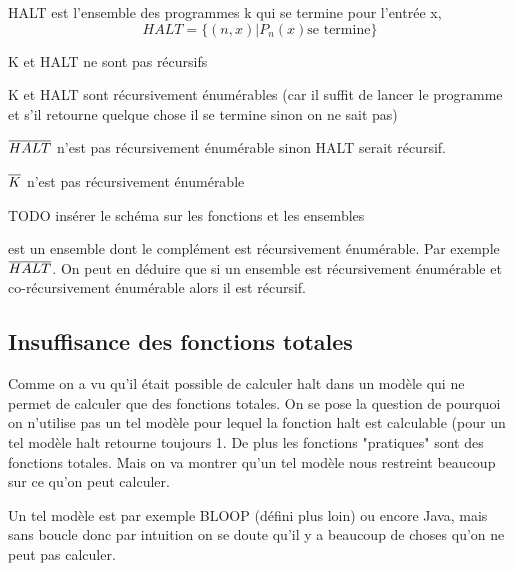 \begin{mydef}[HALT]
	HALT est l'ensemble des programmes k qui se termine pour l'entrée x, 
	\[ HALT = \{(n,x)|P_n(x)\text{se termine}\}\]
\end{mydef}

\begin{myprop}
	K et HALT ne sont pas récursifs
\end{myprop}
	
\begin{myprop}
	K et HALT sont récursivement énumérables (car il suffit de lancer le 
	programme et s’il retourne quelque chose il se termine sinon on ne sait 
	pas)
\end{myprop}
	
\begin{myprop}
	$\overline{HALT}$ n'est pas récursivement énumérable sinon HALT 
		serait récursif.
\end{myprop}
	
\begin{myprop}
	$\overline{K}$ n'est pas récursivement énumérable
\end{myprop}
	

TODO insérer le schéma sur les fonctions et les ensembles

\begin{mydef} est un ensemble dont le 
	complément est récursivement énumérable. Par exemple $\overline{HALT}$. On peut 
	en déduire que si un ensemble est récursivement énumérable et co-récursivement 
	énumérable alors il est récursif.
\end{mydef}


\subsection{Insuffisance des fonctions totales}
\label{sub:insuffisance_des_fonctions_totales}
Comme on a vu qu'il était possible de calculer halt dans un modèle qui
ne permet de calculer que des fonctions totales. On se pose la question de 
pourquoi on n'utilise pas un tel modèle pour lequel la fonction halt est
calculable (pour un tel modèle halt retourne toujours 1.
De plus les fonctions "pratiques" sont 
des fonctions totales. Mais on va montrer qu'un tel modèle nous restreint 
beaucoup sur ce qu'on peut calculer.

\begin{myexem}
	Un tel modèle est par exemple BLOOP (défini plus loin) ou encore 
	Java, mais sans boucle donc par intuition on se doute qu'il y a 
	beaucoup de choses qu'on ne peut pas calculer.
\end{myexem}

